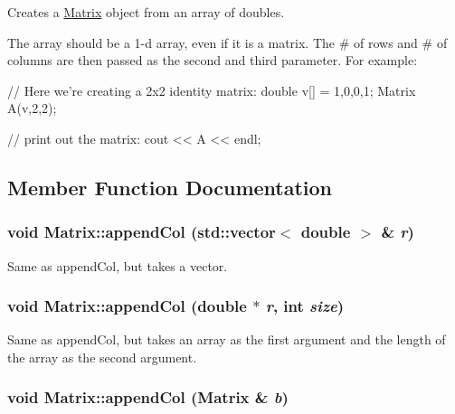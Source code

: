 Creates a \hyperlink{class_matrix}{Matrix} object from an array of doubles. 

The array should be a 1-\/d array, even if it is a matrix. The \# of rows and \# of columns are then passed as the second and third parameter. For example:


\begin{DoxyCode}
            // Here we're creating a 2x2 identity matrix:
            double v[] = {1,0,0,1};
            Matrix A(v,2,2);
            
            // print out the matrix:
            cout << A << endl;
\end{DoxyCode}
 

\subsection{Member Function Documentation}
\hypertarget{class_matrix_a726f7ae83284c090af821752628974af}{
\subsubsection[{appendCol}]{\setlength{\rightskip}{0pt plus 5cm}void Matrix::appendCol (std::vector$<$ double $>$ \& {\em r})}}
\label{class_matrix_a726f7ae83284c090af821752628974af}


Same as appendCol, but takes a vector. 

\hypertarget{class_matrix_aae8efe9de26740e3c953e43de55963b2}{
\subsubsection[{appendCol}]{\setlength{\rightskip}{0pt plus 5cm}void Matrix::appendCol (double $\ast$ {\em r}, \/  int {\em size})}}
\label{class_matrix_aae8efe9de26740e3c953e43de55963b2}


Same as appendCol, but takes an array as the first argument and the length of the array as the second argument. 

\hypertarget{class_matrix_a6d7061bb02cf34f6c79a01ff25b41e84}{
\subsubsection[{appendCol}]{\setlength{\rightskip}{0pt plus 5cm}void Matrix::appendCol ({\bf Matrix} \& {\em b})}}
\label{class_matrix_a6d7061bb02cf34f6c79a01ff25b41e84}


